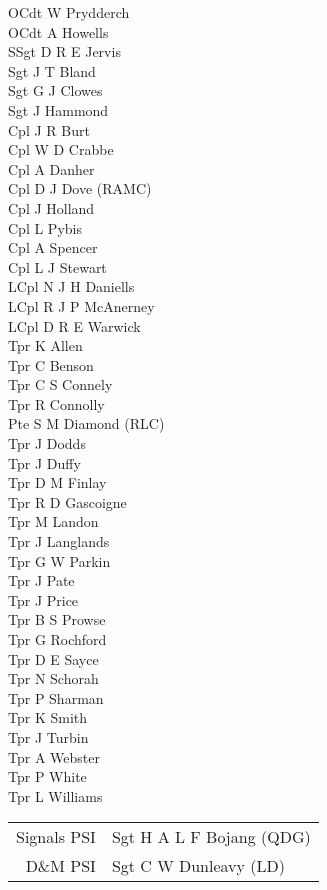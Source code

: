 \begin{multicols}{3}
  \small
  \noindent
  OCdt W Prydderch \\
  OCdt A Howells \\
  SSgt D R E Jervis \\
  Sgt J T Bland \\
  Sgt G J Clowes \\
  Sgt J Hammond \\
  Cpl J R Burt \\
  Cpl W D Crabbe \\
  Cpl A Danher \\
  Cpl D J Dove (RAMC) \\
  Cpl J Holland \\
  Cpl L Pybis \\
  Cpl A Spencer \\
  Cpl L J Stewart \\
  LCpl N J H Daniells \\
  LCpl R J P McAnerney \\
  LCpl D R E Warwick \\
  Tpr K Allen \\
  Tpr C Benson \\
  Tpr C S Connely \\
  Tpr R Connolly \\
  Pte S M Diamond (RLC) \\
  Tpr J Dodds \\
  Tpr J Duffy \\
  Tpr D M Finlay \\
  Tpr R D Gascoigne \\
  Tpr M Landon \\
  Tpr J Langlands \\
  Tpr G W Parkin \\
  Tpr J Pate \\
  Tpr J Price \\
  Tpr B S Prowse \\
  Tpr G Rochford \\
  Tpr D E Sayce \\
  Tpr N Schorah \\
  Tpr P Sharman \\
  Tpr K Smith \\
  Tpr J Turbin \\
  Tpr A Webster \\
  Tpr P White \\
  Tpr L Williams \\
\end{multicols}

\vspace*{10mm}

\begin{center}
  \small
  \begin{tabular}{rl}
    Signals PSI & Sgt H A L F Bojang (QDG) \\
    D\&M PSI & Sgt C W Dunleavy (LD) \\
  \end{tabular}
\end{center}
